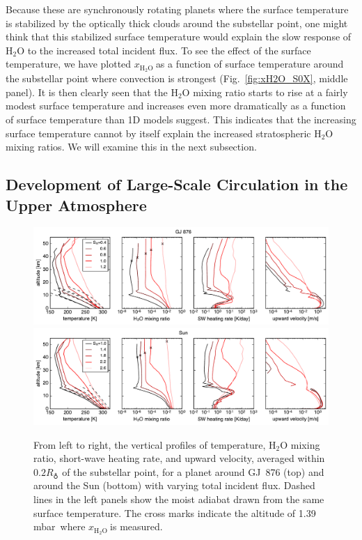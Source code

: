 \documentclass[11pt,numberedappendix,twocolappendix,]{emulateapj}
\def\water{H$_2$O }
\def\xwater{$x_\text{\water}$}
\def\preslevel{1.39 mbar\ }
\begin{document}
Because these are synchronously rotating planets where the surface temperature is stabilized by the optically thick clouds around the substellar point, one might think that this stabilized surface temperature would explain the slow  response of \water to the increased total incident flux. 
To see the effect of the surface temperature, we have plotted \xwater as a function of surface temperature around the substellar point where convection is strongest (Fig.~\ref{fig:xH2O_S0X}, middle panel). 
It is then clearly seen that the \water mixing ratio starts to rise at a fairly modest surface temperature and increases even more dramatically as a function of surface temperature than 1D models suggest. 
This indicates that the increasing surface temperature cannot by itself explain the increased stratospheric \water mixing ratios. 
We will examine this in the next subsection. 

\subsection{Development of Large-Scale Circulation in the Upper Atmosphere}
\label{ss:result_omega}


\begin{figure}[htb]
    \begin{center}
    \includegraphics[width=1\hsize]{fig/AqOH0TLS_GJ876_temp_xH2O_vz_heat.pdf}
    \includegraphics[width=1\hsize]{fig/AqOH0TLS_Sun_temp_xH2O_vz_heat.pdf}
    \end{center}
\caption{From left to right, the vertical profiles of temperature, \water mixing ratio, short-wave heating rate, and upward velocity, averaged within $0.2R_\earth$ of the substellar point, for a planet around GJ~876 (top) and around the Sun (bottom) with varying total incident flux. Dashed lines in the left panels show the moist adiabat drawn from the same surface temperature. The cross marks indicate the altitude of \preslevel where \xwater is measured. }
\label{fig:AqOH0TLS_GJ876_temp_xH2O_vz_heat}
\end{figure}
\end{document}
